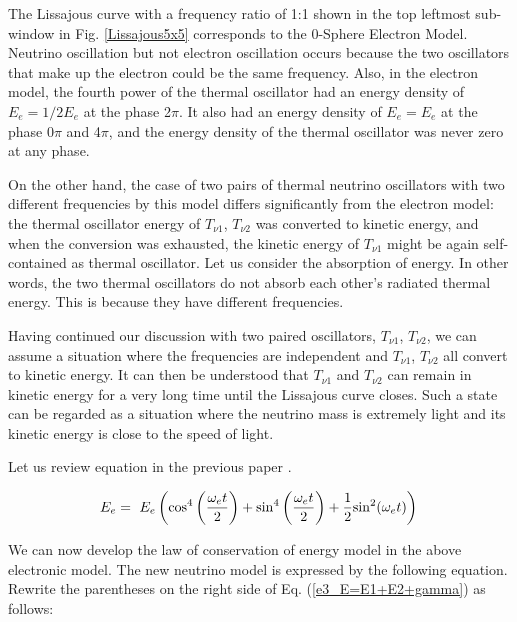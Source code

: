 \documentclass[%
 reprint,
 amsmath,amssymb,
 aps,
]{revtex4-1}
\numberwithin{equation}{section}%
\begin{document}
The Lissajous curve with a frequency ratio of 1:1 shown in the top leftmost sub-window in Fig. \ref{Lissajous5x5} corresponds to the 0-Sphere Electron Model. Neutrino oscillation but not electron oscillation occurs because the two oscillators that make up the electron could be the same frequency. Also, in the electron model, the fourth power of the thermal oscillator had an energy density of $E_e = 1/2E_e$ at the phase 2$\pi$. It also had an energy density of $E_e = E_e$ at the phase 0$\pi$ and 4$\pi$, and the energy density of the thermal oscillator was never zero at any phase.

On the other hand, the case of two pairs of thermal neutrino oscillators with two different frequencies by this model differs significantly from the electron model: the thermal oscillator energy of $T_{\nu \mathrm{1}}$, $T_{\nu \mathrm{2}}$ was converted to kinetic energy, and when the conversion was exhausted, the kinetic energy of $T_{\nu \mathrm{1}}$ might be again self-contained as thermal oscillator. Let us consider the absorption of energy. In other words, the two thermal oscillators do not absorb each other's radiated thermal energy. This is because they have different frequencies.

Having continued our discussion with two paired oscillators, $T_{\nu \mathrm{1}}$, $T_{\nu \mathrm{2}}$, we can assume a situation where the frequencies are independent and $T_{\nu \mathrm{1}}$, $T_{\nu \mathrm{2}}$ all convert to kinetic energy. It can then be understood that $T_{\nu \mathrm{1}}$ and $T_{\nu \mathrm{2}}$ can remain in kinetic energy for a very long time until the Lissajous curve closes. Such a state can be regarded as a situation where the neutrino mass is extremely light and its kinetic energy is close to the speed of light.


Let us review equation in the previous paper \cite{Hanamura1}. 

    \begin{equation}
        E_{e} = \ E_{e} \left( \mathrm{cos}^{4} \left( \frac{\omega_e t}{2} \right) + \mathrm{sin}^{4} \left( \frac{\omega_e t}{2} \right) + \frac{1}{2} \mathrm{sin}^{2} (\omega_e t) \right) \\
        \label{e3_E=E1+E2+gamma}
    \end{equation}


We can now develop the law of conservation of energy model in the above electronic model. The new neutrino model is expressed by the following equation. Rewrite the parentheses on the right side of Eq. (\ref{e3_E=E1+E2+gamma}) as follows:
\end{document}
